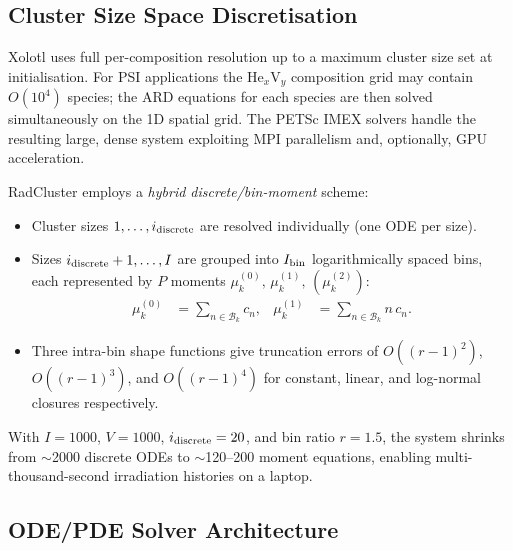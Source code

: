 \documentclass[12pt,letterpaper]{article}
\begin{document}
\subsection{Cluster Size Space Discretisation}

Xolotl uses full per-composition resolution up to a maximum cluster
size set at initialisation.  For PSI applications the He$_x$V$_y$
composition grid may contain $O(10^4)$ species; the ARD equations for
each species are then solved simultaneously on the 1D spatial grid.
The PETSc IMEX solvers handle the resulting large, dense system
exploiting MPI parallelism and, optionally, GPU acceleration.

RadCluster employs a \emph{hybrid discrete/bin-moment} scheme:

\begin{itemize}
  \item Cluster sizes $1,\ldots,i_{\rm discrete}$ are resolved
    individually (one ODE per size).
  \item Sizes $i_{\rm discrete}+1,\ldots,I$ are grouped into
    $I_{\rm bin}$ logarithmically spaced bins, each represented by
    $P$ moments $\mu_k^{(0)},\,\mu_k^{(1)},\,(\mu_k^{(2)})$:
    \begin{align}
      \mu_k^{(0)} &= \sum_{n \in \mathcal{B}_k} c_n,
      &
      \mu_k^{(1)} &= \sum_{n \in \mathcal{B}_k} n\,c_n.
    \end{align}
  \item Three intra-bin shape functions give truncation errors of
    $O((r-1)^2)$, $O((r-1)^3)$, and $O((r-1)^4)$ for constant, linear,
    and log-normal closures respectively.
\end{itemize}
With $I = 1000$, $V = 1000$, $i_{\rm discrete} = 20$, and bin ratio
$r = 1.5$, the system shrinks from $\sim$2000 discrete ODEs to
$\sim$120--200 moment equations, enabling multi-thousand-second
irradiation histories on a laptop.

\subsection{ODE/PDE Solver Architecture}
\end{document}

